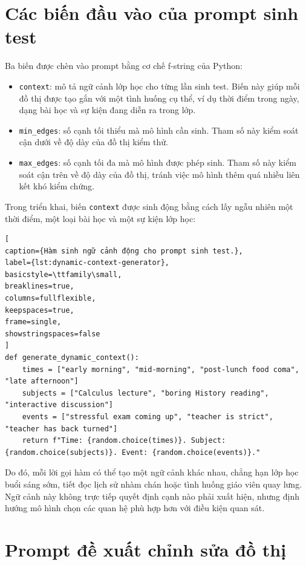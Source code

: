 \section{Các biến đầu vào của prompt sinh test}

Ba biến được chèn vào prompt bằng cơ chế f-string của Python:
\begin{itemize}
\item \texttt{context}: mô tả ngữ cảnh lớp học cho từng lần sinh test. Biến này giúp mỗi đồ thị được tạo gắn với một tình huống cụ thể, ví dụ thời điểm trong ngày, dạng bài học và sự kiện đang diễn ra trong lớp.
\item \texttt{min\_edges}: số cạnh tối thiểu mà mô hình cần sinh. Tham số này kiểm soát cận dưới về độ dày của đồ thị kiểm thử.
\item \texttt{max\_edges}: số cạnh tối đa mà mô hình được phép sinh. Tham số này kiểm soát cận trên về độ dày của đồ thị, tránh việc mô hình thêm quá nhiều liên kết khó kiểm chứng.
\end{itemize}

Trong triển khai, biến \texttt{context} được sinh động bằng cách lấy ngẫu nhiên một thời điểm, một loại bài học và một sự kiện lớp học:

\begin{lstlisting}[
caption={Hàm sinh ngữ cảnh động cho prompt sinh test.},
label={lst:dynamic-context-generator},
basicstyle=\ttfamily\small,
breaklines=true,
columns=fullflexible,
keepspaces=true,
frame=single,
showstringspaces=false
]
def generate_dynamic_context():
    times = ["early morning", "mid-morning", "post-lunch food coma", "late afternoon"]
    subjects = ["Calculus lecture", "boring History reading", "interactive discussion"]
    events = ["stressful exam coming up", "teacher is strict", "teacher has back turned"]
    return f"Time: {random.choice(times)}. Subject: {random.choice(subjects)}. Event: {random.choice(events)}."
\end{lstlisting}

Do đó, mỗi lời gọi hàm có thể tạo một ngữ cảnh khác nhau, chẳng hạn lớp học buổi sáng sớm, tiết đọc lịch sử nhàm chán hoặc tình huống giáo viên quay lưng. Ngữ cảnh này không trực tiếp quyết định cạnh nào phải xuất hiện, nhưng định hướng mô hình chọn các quan hệ phù hợp hơn với điều kiện quan sát.

\section{Prompt đề xuất chỉnh sửa đồ thị}

